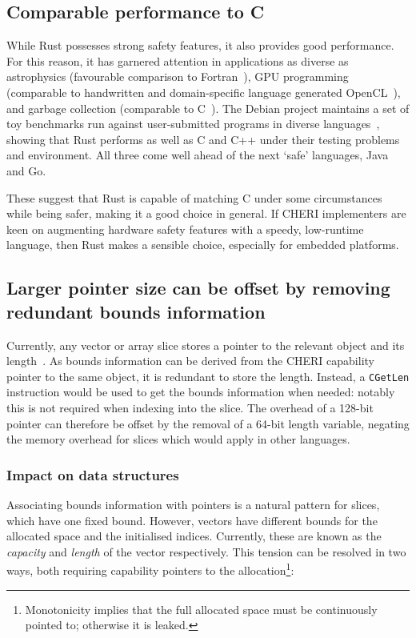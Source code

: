 \documentclass[dissertation.tex]{subfiles}
\begin{document}
\subsection{Comparable performance to C}
\label{sec:eval-cheri-perf}

While Rust possesses strong safety features, it also provides good
performance.
For this reason, it has garnered attention in applications as diverse as
astrophysics (favourable comparison to Fortran~\cite{blanco-astro}), GPU
programming (comparable to handwritten and domain-specific language
generated OpenCL~\cite{holk-gpu}), and garbage collection (comparable to
C~\cite{lin-gc}).
The Debian project maintains a set of toy benchmarks run against
user-submitted programs in diverse
languages~\cite{debian-benchmarksgame}, showing that Rust performs as
well as C and C++ under their testing problems and environment.
All three come well ahead of the next `safe' languages, Java and Go.

These suggest that Rust is capable of matching C under some
circumstances while being safer, making it a good choice in general.
If CHERI implementers are keen on augmenting hardware safety features
with a speedy, low-runtime language, then Rust makes a sensible choice,
especially for embedded platforms.


\subsection{Larger pointer size can be offset by removing redundant bounds information}
\label{sec:eval-cheri-memfoot}

Currently, any vector or array slice stores a pointer to the relevant
object and its length~\cite{blandy-orendorff}.
As bounds information can be derived from the CHERI capability pointer
to the same object, it is redundant to store the length.
Instead, a \texttt{CGetLen} instruction would be used to get the bounds
information when needed: notably this is not required when indexing into
the slice.
The overhead of a 128-bit pointer can therefore be offset by the removal
of a 64-bit length variable, negating the memory overhead for slices
which would apply in other languages.

\subsubsection{Impact on data structures}
Associating bounds information with pointers is a natural pattern for
slices, which have one fixed bound.
However, vectors have different bounds for the allocated space and the
initialised indices.
Currently, these are known as the \emph{capacity} and \emph{length} of
the vector respectively.
This tension can be resolved in two ways, both requiring capability
pointers to the allocation\footnote{
Monotonicity implies that the full allocated space must be continuously
pointed to; otherwise it is leaked.
}:
\end{document}
